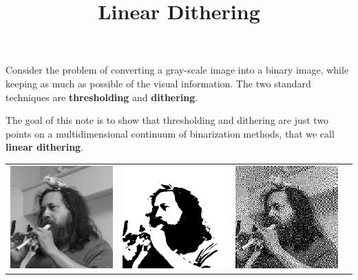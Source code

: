 \title{Linear Dithering}

Consider the problem of converting a gray-scale image into a binary image,
while keeping as much as possible of the visual information.
The two standard techniques are {\bf thresholding} and {\bf dithering}.

The goal of this note is to show that thresholding and dithering are just two
points on a multidimensional continuum of binarization methods, that we call
{\bf linear dithering}.

\begin{tabular}{llll}
	\includegraphics{i/weiro.png} &
	\includegraphics{weiro-bin.png} &
	\includegraphics{weiro-dit.png} &

\end{tabular}
